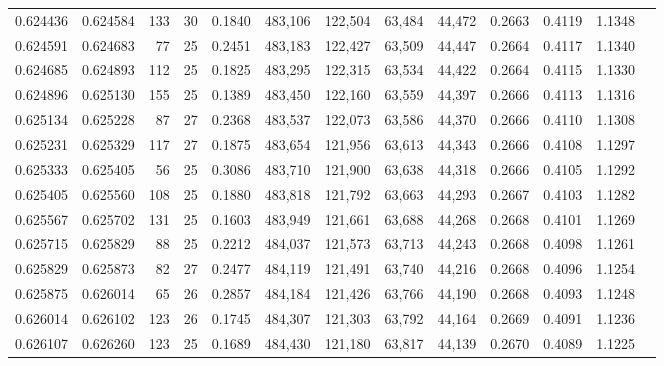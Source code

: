 \begin{tabular}{rrrrrrrrrrrrr}
0.624436 & 0.624584 &   133 &  30 &                                     0.1840 & 483,106 & 122,504 &  63,484 &  44,472 & 0.2663 & 0.4119 & 1.1348 \\
0.624591 & 0.624683 &    77 &  25 &                                     0.2451 & 483,183 & 122,427 &  63,509 &  44,447 & 0.2664 & 0.4117 & 1.1340 \\
0.624685 & 0.624893 &   112 &  25 &                                     0.1825 & 483,295 & 122,315 &  63,534 &  44,422 & 0.2664 & 0.4115 & 1.1330 \\
0.624896 & 0.625130 &   155 &  25 &                                     0.1389 & 483,450 & 122,160 &  63,559 &  44,397 & 0.2666 & 0.4113 & 1.1316 \\
0.625134 & 0.625228 &    87 &  27 &                                     0.2368 & 483,537 & 122,073 &  63,586 &  44,370 & 0.2666 & 0.4110 & 1.1308 \\
0.625231 & 0.625329 &   117 &  27 &                                     0.1875 & 483,654 & 121,956 &  63,613 &  44,343 & 0.2666 & 0.4108 & 1.1297 \\
0.625333 & 0.625405 &    56 &  25 &                                     0.3086 & 483,710 & 121,900 &  63,638 &  44,318 & 0.2666 & 0.4105 & 1.1292 \\
0.625405 & 0.625560 &   108 &  25 &                                     0.1880 & 483,818 & 121,792 &  63,663 &  44,293 & 0.2667 & 0.4103 & 1.1282 \\
0.625567 & 0.625702 &   131 &  25 &                                     0.1603 & 483,949 & 121,661 &  63,688 &  44,268 & 0.2668 & 0.4101 & 1.1269 \\
0.625715 & 0.625829 &    88 &  25 &                                     0.2212 & 484,037 & 121,573 &  63,713 &  44,243 & 0.2668 & 0.4098 & 1.1261 \\
0.625829 & 0.625873 &    82 &  27 &                                     0.2477 & 484,119 & 121,491 &  63,740 &  44,216 & 0.2668 & 0.4096 & 1.1254 \\
0.625875 & 0.626014 &    65 &  26 &                                     0.2857 & 484,184 & 121,426 &  63,766 &  44,190 & 0.2668 & 0.4093 & 1.1248 \\
0.626014 & 0.626102 &   123 &  26 &                                     0.1745 & 484,307 & 121,303 &  63,792 &  44,164 & 0.2669 & 0.4091 & 1.1236 \\
0.626107 & 0.626260 &   123 &  25 &                                     0.1689 & 484,430 & 121,180 &  63,817 &  44,139 & 0.2670 & 0.4089 & 1.1225 \\

\end{tabular}
